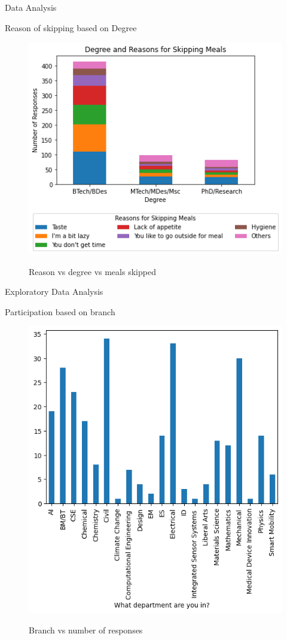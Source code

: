 \documentclass{beamer}
\begin{document}
\begin{frame}{Data Analysis}
\begin{block}{Reason of skipping based on Degree}
\begin{figure}
      \centering
    \caption{Reason vs degree vs meals skipped}
    \includegraphics[scale = 0.45]{Meal Skipping - Reason Seg chart.png}  
    \label{gender_seg}
\end{figure}
\end{block}
\end{frame}
\begin{frame}{Exploratory Data Analysis}
\begin{block}{Participation based on branch}
\begin{figure}
      \centering
    \caption{Branch vs number of responses}
    \includegraphics[scale = 0.4]{bar_department.png}  
    \label{fig:bar_department}
\end{figure}
\end{block}
\end{frame}
\end{document}
